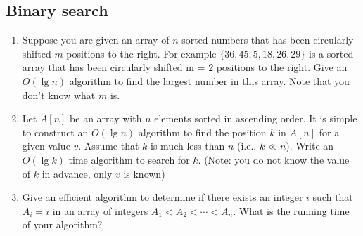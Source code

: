 \begin{refsection}
\subsection{Binary search}
\begin{Exercise}
\begin{enumerate}
\item Suppose you are given an array of $n$ sorted numbers that has been circularly shifted $m$ positions to the right. For example $\{36, 45, 5, 18, 26, 29\}$ is a sorted array that has been circularly shifted m = $2$ positions to the right. Give an $O(\lg n)$ algorithm to find the largest number in this array. Note that you don't know what $m$ is. 
\item Let $A[n]$ be an array with $n$ elements sorted in ascending order. It is simple to construct an $O(\lg n)$ algorithm to find the position $k$ in $A[n]$ for a given value $v$. Assume that $k$ is much less than $n$ (i.e., $k \ll n$). Write an $O(\lg k)$ time algorithm to search for $k$.
(Note: you do not know the value of $k$ in advance, only $v$ is known) 
\item Give an efficient algorithm to determine if there exists an integer $i$ such that $A_i = i$ in an array of integers $A_1 < A_2 < \cdots < A_n$. What is the running time of your algorithm? 
\end{enumerate}
\end{Exercise}
\begin{Answer}
\end{Answer}


\end{refsection}
